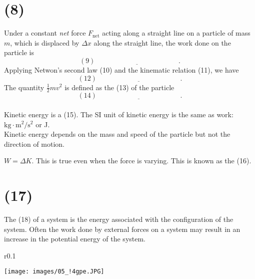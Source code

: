 \documentclass[11pt,a4paper]{report}
\begin{document}
\section{(8)\underline{\hspace{4cm}}}
Under a constant \textit{net} force $F_\mathrm{net}$ acting along a straight line on a particle of mass $m$, which is displaced by $\Delta{x}$ along the straight line, the work done on the particle is $$\left(9\right)\underline{\hspace{5cm}}.$$
Applying Netwon's second law (10)\underline{\hspace{2cm}} and the kinematic relation (11)\underline{\hspace{2cm}}, we have $$\left(12\right)\underline{\hspace{5cm}}.$$
The quantity $\frac{1}{2} mv^2$ is defined as the (13)\underline{\hspace{3cm}} of the particle $$\left(14\right)\underline{\hspace{5cm}}.$$
\\Kinetic energy is a (15)\underline{\hspace{2cm}}. The SI unit of kinetic energy is the same as work: $\mathrm{kg} \cdot \mathrm{m}^2 / \mathrm{s}^2$ or J.
\\Kinetic energy depends on the mass and speed of the particle but not the direction of motion.

\smallskip

\noindent
$W = \Delta{K}$. This is true even when the force is varying. This is known as the (16)\underline{\hspace{3cm}}.

\section{(17)\underline{\hspace{4cm}}}
The (18)\underline{\hspace{3cm}} of a system is the energy associated with the configuration of the system. Often the work done by external forces on a system may result in an increase in the potential energy of the system.

\begin{wrapfigure}{r}{0.1\textwidth}
\vspace{-23pt}
\begin{center}
\texttt{[image: images/05\_!4gpe.JPG]}
\end{center}
\vspace{-20pt}
\end{wrapfigure}
\end{document}
